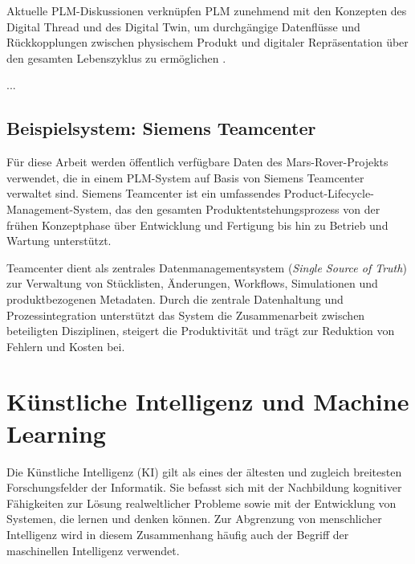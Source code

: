 Aktuelle PLM-Diskussionen verknüpfen PLM zunehmend mit den Konzepten des Digital Thread und des Digital Twin, um durchgängige Datenflüsse und Rückkopplungen zwischen physischem Produkt und digitaler Repräsentation über den gesamten Lebenszyklus zu ermöglichen \cite{stark2022product, grieves2016digital}.

...

\subsection{Beispielsystem: Siemens Teamcenter}

Für diese Arbeit werden öffentlich verfügbare Daten des Mars-Rover-Projekts verwendet, die in einem PLM-System auf Basis von Siemens Teamcenter verwaltet sind. Siemens Teamcenter ist ein umfassendes Product-Lifecycle-Management-System, das den gesamten Produktentstehungsprozess von der frühen Konzeptphase über Entwicklung und Fertigung bis hin zu Betrieb und Wartung unterstützt.

Teamcenter dient als zentrales Datenmanagementsystem (\emph{Single Source of Truth}) zur Verwaltung von Stücklisten, Änderungen, Workflows, Simulationen und produktbezogenen Metadaten. Durch die zentrale Datenhaltung und Prozessintegration unterstützt das System die Zusammenarbeit zwischen beteiligten Disziplinen, steigert die Produktivität und trägt zur Reduktion von Fehlern und Kosten bei. \cite{siemens_teamcenter_x_2026}




\section{Künstliche Intelligenz und Machine Learning} 
Die Künstliche Intelligenz (KI) gilt als eines der ältesten und zugleich breitesten Forschungsfelder der Informatik. Sie befasst sich mit der Nachbildung kognitiver Fähigkeiten zur Lösung realweltlicher Probleme sowie mit der Entwicklung von Systemen, die lernen und denken können. Zur Abgrenzung von menschlicher Intelligenz wird in diesem Zusammenhang häufig auch der Begriff der maschinellen Intelligenz verwendet. \cite{fogel1966artificial}

